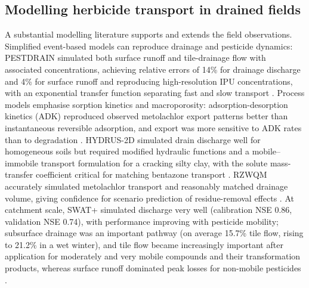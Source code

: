 \documentclass[11pt]{article}
\begin{document}
\subsection{Modelling herbicide transport in drained fields}
A substantial modelling literature supports and extends the field observations. Simplified event-based models can reproduce drainage and pesticide dynamics: PESTDRAIN simulated both surface runoff and tile-drainage flow with associated concentrations, achieving relative errors of 14\% for drainage discharge and 4\% for surface runoff and reproducing high-resolution IPU concentrations, with an exponential transfer function separating fast and slow transport \parencite{Branger2009}. Process models emphasise sorption kinetics and macroporosity: adsorption-desorption kinetics (ADK) reproduced observed metolachlor export patterns better than instantaneous reversible adsorption, and export was more sensitive to ADK rates than to degradation \parencite{Novak2003}. HYDRUS-2D simulated drain discharge well for homogeneous soils but required modified hydraulic functions and a mobile--immobile transport formulation for a cracking silty clay, with the solute mass-transfer coefficient critical for matching bentazone transport \parencite{Boivin2006}. RZWQM accurately simulated metolachlor transport and reasonably matched drainage volume, giving confidence for scenario prediction of residue-removal effects \parencite{Shipitalo2016}. At catchment scale, SWAT+ simulated discharge very well (calibration NSE 0.86, validation NSE 0.74), with performance improving with pesticide mobility; subsurface drainage was an important pathway (on average 15.7\% tile flow, rising to 21.2\% in a wet winter), and tile flow became increasingly important after application for moderately and very mobile compounds and their transformation products, whereas surface runoff dominated peak losses for non-mobile pesticides \parencite{Wendell2024}.
\end{document}
